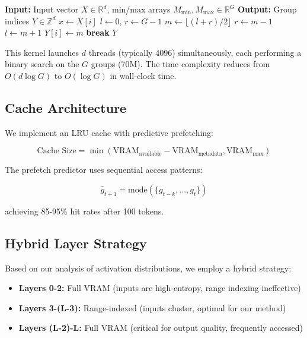 \documentclass[twocolumn,10pt]{article}
\begin{document}
\begin{algorithm}[t]
\caption{Parallel Range Checking (GPU Kernel)}
\begin{algorithmic}[1]
\STATE \textbf{Input:} Input vector $X \in \mathbb{R}^d$, min/max arrays $M_{\min}, M_{\max} \in \mathbb{R}^G$
\STATE \textbf{Output:} Group indices $Y \in \mathbb{Z}^d$
    \STATE $x \gets X[i]$
    \STATE $l \gets 0$, $r \gets G-1$
        \STATE $m \gets \lfloor (l+r)/2 \rfloor$
            \STATE $r \gets m-1$
            \STATE $l \gets m+1$
        \ELSE
            \STATE $Y[i] \gets m$
            \STATE \textbf{break}
        \ENDIF
    \ENDWHILE
\ENDFOR
\RETURN $Y$
\end{algorithmic}
\label{alg:gpu_range}
\end{algorithm}

This kernel launches $d$ threads (typically 4096) simultaneously, each performing a binary search on the $G$ groups (70M). The time complexity reduces from $O(d \log G)$ to $O(\log G)$ in wall-clock time.

\subsection{Cache Architecture}

We implement an LRU cache with predictive prefetching:

\begin{equation}
\text{Cache Size} = \min(\text{VRAM}_{\text{available}} - \text{VRAM}_{\text{metadata}}, \text{VRAM}_{\text{max}})
\end{equation}

The prefetch predictor uses sequential access patterns:

\begin{equation}
\hat{g}_{t+1} = \text{mode}(\{g_{t-k}, \ldots, g_t\})
\end{equation}

achieving 85-95\% hit rates after 100 tokens.

\subsection{Hybrid Layer Strategy}

Based on our analysis of activation distributions, we employ a hybrid strategy:

\begin{itemize}
    \item \textbf{Layers 0-2:} Full VRAM (inputs are high-entropy, range indexing ineffective)
    \item \textbf{Layers 3-(L-3):} Range-indexed (inputs cluster, optimal for our method)
    \item \textbf{Layers (L-2)-L:} Full VRAM (critical for output quality, frequently accessed)
\end{itemize}
\end{document}
